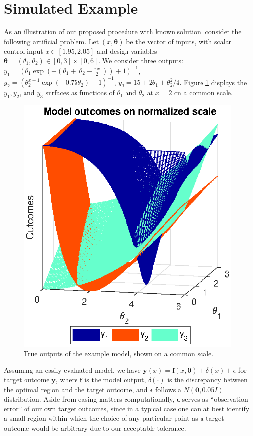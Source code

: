 \documentclass[12pt]{article}
\begin{document}
\section{Simulated Example}\label{example}
As an illustration of our proposed procedure with known solution, consider the following artificial problem. 
%
Let $(x,\boldsymbol \theta)$ be the vector of inputs, with scalar control input $x\in[1.95,2.05]$ and design variables $\boldsymbol \theta = (\theta_1,\theta_2)\in[0,3]\times[0,6]$.
%
We consider three outputs:
%
$
y_1 = \left(\theta_1 \exp\left(-\left(\theta_1 + \lvert \theta_2-\frac{\pi x}2\rvert \right)\right)+1\right)^{-1}$, 
$
y_2 = \left(\theta_2^{x-1} \exp\left(-0.75 \theta_2\right) + 1 \right)^{-1}
$, 
$
y_3 = 15 + 2 \theta_1 + {\theta_2^2}/4.
$
%
Figure \ref{fig:toy_sim_outputs} displays the $y_1, y_2$, and $y_3$ surfaces as functions of $\theta_1$ and $\theta_2$ at $x = 2$ on a common scale.
%
\begin{figure}
\centering
\includegraphics[scale=.8]{FIG_toy_sim_model_outputs.eps}
\caption{True outputs of the example model, shown on a common scale.}
\label{fig:toy_sim_outputs}
\end{figure}
%
Assuming an easily evaluated model, we have
%
$
\mathbf y(x) = \mathbf f(x,\boldsymbol \theta) + \delta(x) + \epsilon
$
%
for target outcome $\mathbf y$, where $\mathbf f$ is the model output, $\delta(\cdot)$ is the discrepancy between the optimal region and the target outcome, and $\boldsymbol \epsilon$ follows a $N(\mathbf 0,0.05I)$ distribution. 
%
Aside from easing matters computationally, $\boldsymbol \epsilon$ serves as ``observation error'' of our own target outcomes, since in a typical case one can at best identify a small region within which the choice of any particular point as a target outcome would be arbitrary due to our acceptable tolerance.
%
\end{document}
